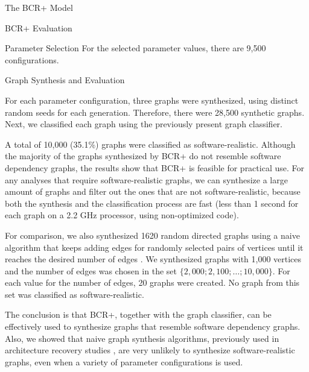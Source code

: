 \documentclass[11pt,twocolumn,a4paper,english]{article}
\begin{document}
\begin{section}{The BCR+ Model}
\begin{subsection}{BCR+ Evaluation}
\begin{subsubsection}{Parameter Selection}
	For the selected parameter values, there are 9,500 configurations.

\end{subsubsection}

\begin{subsubsection}{Graph Synthesis and Evaluation} \label{sec:bcr-synthesis}
	
	For each parameter configuration, three graphs were synthesized, using distinct random seeds for each generation. Therefore, there were 28,500 synthetic graphs. Next, we classified each graph using the previously present graph classifier.

	
	A total of 10,000 (35.1\%) graphs were classified as software-realistic. Although the majority of the graphs synthesized by BCR+ do not resemble software dependency graphs, the results show that BCR+ is feasible for practical use. For any analyses that require software-realistic graphs, we can synthesize a large amount of graphs and filter out the ones that are not software-realistic, because both the synthesis and the classification process are fast (less than 1 second for each graph on a 2.2 GHz processor, using non-optimized code).

	For comparison, we also synthesized 1620 random directed graphs using a naive algorithm that keeps adding edges for randomly selected pairs of vertices until it reaches the desired number of edges \cite{Erdos1959}. We synthesized graphs with 1,000 vertices and the number of edges was chosen in the set $\{2,000; 2,100; \ldots ; 10,000\}$. For each value for the number of edges, 20 graphs were created. No graph from this set was classified as software-realistic. 
	
	The conclusion is that BCR+, together with the graph classifier, can be effectively used to synthesize graphs that resemble software dependency graphs. Also, we showed that naive graph synthesis algorithms, previously used in architecture recovery studies \cite{Mitchell2007}, are very unlikely to synthesize software-realistic graphs, even when a variety of parameter configurations is used.
	

\end{subsubsection}
\end{subsection}
\end{section}
\end{document}
